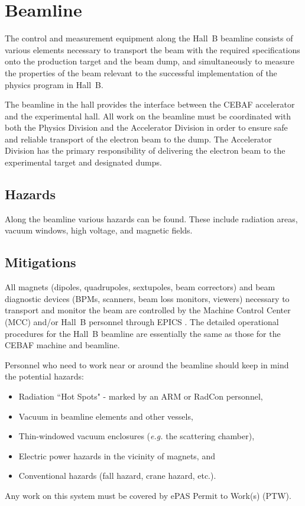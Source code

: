 \section{Beamline}

The control and measurement equipment along the Hall~B beamline consists of various 
elements necessary to transport the beam with the required specifications onto the 
production target and the beam dump, and simultaneously to measure the properties of 
the beam relevant to the successful implementation of the physics program in Hall~B. 

The beamline in the hall provides the interface between the CEBAF accelerator and the 
experimental hall. All work on the beamline must be coordinated with both the Physics 
Division and the Accelerator Division in order to ensure safe and reliable transport of 
the electron beam to the dump. The Accelerator Division has the primary responsibility 
of delivering the electron beam to the experimental target and designated dumps.

\subsection{Hazards} 

Along the beamline various hazards can be found. These include radiation areas, vacuum 
windows, high voltage, and magnetic fields.

\subsection{Mitigations}

All magnets (dipoles, quadrupoles, sextupoles, beam correctors) and beam diagnostic devices 
(BPMs, scanners, beam loss monitors, viewers) necessary to transport and monitor the beam 
are controlled by the Machine Control Center (MCC) and/or Hall~B personnel through EPICS 
\cite{epics}. The detailed operational procedures for the Hall~B beamline are essentially 
the same as those for the CEBAF machine and beamline.

Personnel who need to work near or around the beamline should keep in mind the potential 
hazards:
\begin{itemize}
\item Radiation ``Hot Spots" - marked by an ARM or RadCon personnel,
\item Vacuum in beamline elements and other vessels,
\item Thin-windowed vacuum enclosures ({\it e.g.} the scattering chamber),
\item Electric power hazards in the vicinity of magnets, and 
\item Conventional hazards (fall hazard, crane hazard, etc.). 
\end{itemize} 
Any work on this system must be covered by ePAS Permit to Work(s) (PTW).

